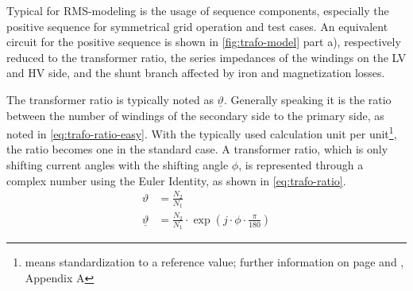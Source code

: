 Typical for \acs{RMS}-modeling is the usage of sequence components, especially the positive sequence for symmetrical grid operation and test cases. \quelle 
An equivalent circuit for the positive sequence is shown in \autoref{fig:trafo-model} part a), respectively reduced to the transformer ratio, the series impedances of the windings on the \acs{LV} and \acs{HV} side, and the shunt branch affected by iron and magnetization losses. \autocite{machowski_2020,kundur_2022,milano_2010}

The transformer ratio is typically noted as $\underline{\vartheta}$. 
Generally speaking it is the ratio between the number of windings of the secondary side to the primary side, as noted in \autoref{eq:trafo-ratio-easy}. 
With the typically used calculation unit \glqq per unit\grqq\footnote{means standardization to a reference value; further information on page \pageref{chap:symbols} and \textcite{machowski_2020}, Appendix A}, the ratio becomes one in the standard case. 
A transformer ratio, which is only shifting current angles with the shifting angle $\phi$, is represented through a complex number using the Euler Identity, as shown in \autoref{eq:trafo-ratio}.
\begin{align}
    \vartheta&=\frac{N_2}{N_1} \label{eq:trafo-ratio-easy} \\[6pt]
    \underline{\vartheta}&=\frac{N_2}{N_1} \cdot \exp(j \cdot \phi \cdot \frac{\pi}{180})\label{eq:trafo-ratio}
\end{align}

